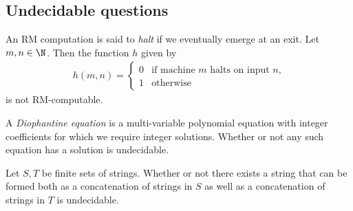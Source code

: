 \documentclass{article}
\begin{document}
\subsection{Undecidable questions}

\begin{theorem}
	An RM computation is said to \emph{halt} if we eventually emerge at
	an exit. Let $m,n\in\N$. Then the function $h$ given by
	\begin{align*}
		h(m,n)=\begin{cases}
			0 &\text{if machine $m$ halts on input $n$,}\\
			1 &\text{otherwise}
		\end{cases}	
	\end{align*}
	is not RM-computable.
\end{theorem}

\begin{theorem}
	A \emph{Diophantine equation} is a multi-variable polynomial
	equation with integer coefficients for which we require integer
	solutions. Whether or not any such equation has a solution is
	undecidable.
\end{theorem}

\begin{theorem}
	Let $S,T$ be finite sets of strings. Whether or not there exists
	a string that can be formed both as a concatenation of strings in
	$S$ as well as a concatenation of strings in $T$ is undecidable.
\end{theorem}
\end{document}
